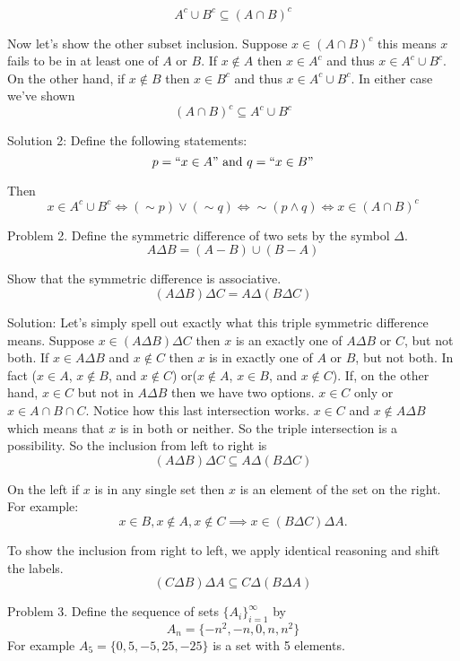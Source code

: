 \documentclass[16 pt]{amsart}
\theoremstyle{definition}
\theoremstyle{remark}
\numberwithin{equation}{subsection}
\begin{document}
\[
A^c \cup B^c \subseteq (A\cap B)^c
\]

Now let's show the other subset inclusion.  Suppose $x\in(A\cap B)^c$ this means $x$ fails to be in at least one of $A$ or $B$.
If $x\notin A$ then $x\in A^c$ and thus $x\in A^c\cup B^c$.  On the other hand, if $x\notin B$ then $x\in B^c$ and thus $x\in A^c\cup B^c$.  In either case we've shown
\[
(A\cap B)^c \subseteq A^c \cup B^c 
\]

\vspace{1in}

Solution 2:  Define the following statements:
\[
p = ``x\in A" \text{ and } q = ``x\in B"
\]

Then 
\[
x\in A^c\cup B^c \iff (\sim p)\vee (\sim q) \iff \sim(p\wedge q) \iff x\in (A\cap B)^c
\]



\newpage

Problem 2.  Define the symmetric difference of two sets by the symbol $\Delta$.
\[
A\Delta B = (A-B)\cup(B-A)
\]

Show that the symmetric difference is associative.
\[
(A\Delta B)\Delta C = A\Delta (B\Delta C)
\]

\vspace{1in}

Solution: Let's simply spell out exactly what this triple symmetric difference means.  Suppose $x\in(A\Delta B)\Delta C$ then $x$ is an exactly one of $A\Delta B$ or $C$, but not both.  If $x\in A\Delta B$ and $x\notin C$ then $x$ is in exactly one of $A$ or $B$, but not both.  In fact ($x\in A$, $x\notin B$, and $x\notin C$) or($x\notin A$, $x\in B$, and $x\notin C$).  If, on the other hand, $x\in C$ but not in $A\Delta B$ then we have two options.  $x\in C$ only or $x\in A\cap B\cap C$.  Notice how this last intersection works. $x\in C$ and $x\notin A\Delta B$ which means that $x$ is in both or neither.  So the triple intersection is a possibility.  So the inclusion from left to right is 
\[
(A\Delta B)\Delta C \subseteq A\Delta(B\Delta C)
\]

On the left if $x$ is in any single set then $x$ is an element of the set on the right. For example:
\[
x\in B, x \notin A, x\notin C \implies x\in(B\Delta C) \Delta A.
\]

To show the inclusion from right to left, we apply identical reasoning and shift the labels.
\[
(C\Delta B)\Delta A \subseteq C\Delta (B\Delta A) 
\]

\newpage

Problem 3. Define the sequence of sets $\{A_i\}_{i=1}^{\infty}$ by
\[
A_n = \{-n^2,-n,0,n,n^2\}
\]
For example $A_5 = \{0,5,-5,25,-25\}$ is a set with 5 elements.\\
\end{document}
